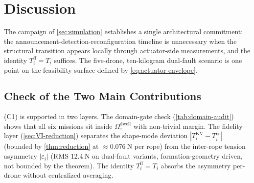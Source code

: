 \documentclass[lettersize,journal]{IEEEtran}
\begin{document}




\section{Discussion}
The campaign of \cref{sec:simulation} establishes a single architectural commitment: the announcement-detection-reconfiguration timeline is unnecessary when the structural transition appears locally through actuator-side measurements, and the identity $T_i^{\mathrm{ff}}=T_i$ suffices. The five-drone, ten-kilogram dual-fault scenario is one point on the feasibility surface defined by \eqref{eq:actuator-envelope}.

\subsection{Check of the Two Main Contributions}
\label{sec:discussion-audit}

 (C1) is supported in two layers. The domain-gate check (\cref{tab:domain-audit}) shows that all six missions sit inside $\Omega^{\mathrm{dwell}}_{\tau}$ with non-trivial margin. The fidelity layer (\cref{sec:VI-reduction}) separates the shape-mode deviation $|T_i^{\mathrm{KV}} - T_i^{\mathrm{qs}}|$ (bounded by \cref{thm:reduction} at $\approx\SI{0.076}{\newton}$ per rope) from the inter-rope tension asymmetry $|\varepsilon_i|$ (RMS $\SI{12.4}{\newton}$ on dual-fault variants, formation-geometry driven, not bounded by the theorem). The identity $T_i^{\mathrm{ff}} = T_i$ absorbs the asymmetry per-drone without centralized averaging.
\end{document}
